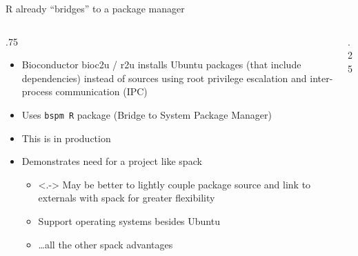 \documentclass[
aspectratio=169,
xcolor={usenames}
]{beamer}
\begin{document}
\begin{frame}{R already ``bridges'' to a package manager}
  \begin{columns}[T]
    \begin{column}{.75\framewidth}
      \begin{itemize}[<+->]
      \item Bioconductor bioc2u / r2u %
        installs Ubuntu packages (that include dependencies) %
        instead of sources using root privilege escalation and %
        inter-process communication (IPC)
      \item Uses \texttt{bspm R} package (Bridge to System Package Manager)
      \item This is in production\footnotemark[1]
      \item Demonstrates need for a project like spack
        \begin{itemize}
        \item<.-> May be better to lightly couple package source %
          and link to externals with spack for greater flexibility
        \item Support operating systems besides Ubuntu
        \item<5-> \ldots all the other spack advantages
        \end{itemize}
      \end{itemize}
    \end{column}
    \begin{column}{.25\framewidth}
\end{column}
\end{columns}
\end{frame}
\end{document}
